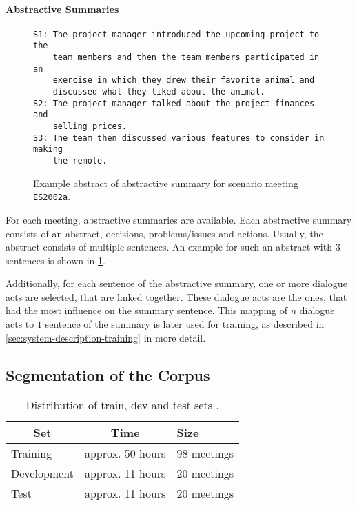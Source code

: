 \paragraph{Abstractive Summaries}

\begin{figure}[h]
\begin{lstlisting}[numbers=none]
S1: The project manager introduced the upcoming project to the 
    team members and then the team members participated in an
    exercise in which they drew their favorite animal and
    discussed what they liked about the animal.
S2: The project manager talked about the project finances and
    selling prices.
S3: The team then discussed various features to consider in making
    the remote.
\end{lstlisting}
\caption{Example abstract of abstractive summary for scenario meeting \texttt{ES2002a}.}
\label{fig:abstractive-summary-example}
\end{figure}

For each meeting, abstractive summaries are available.
Each abstractive summary consists of an abstract, decisions, problems/issues and actions.
Usually, the abstract consists of multiple sentences.
An example for such an abstract with 3 sentences is shown in \cref{fig:abstractive-summary-example}.

Additionally, for each sentence of the abstractive summary, one or more dialogue acts are selected, that are linked together.
These dialogue acts are the ones, that had the most influence on the summary sentence.
This mapping of $n$ dialogue acts to $1$ sentence of the summary is later used for training, as described in \cref{sec:system-description-training} in more detail. \cite{amiWebsite}

\subsection{Segmentation of the Corpus}\label{ssec:ami-segmentation-of-the-corpus}

\begin{table}[h]
\centering
\begin{tabular}{@{}lll@{}}
\toprule
\multicolumn{1}{c}{\textbf{Set}} & \multicolumn{1}{c}{\textbf{Time}} & \textbf{Size} \\ \midrule
Training                         & approx. 50 hours                  & 98 meetings   \\
Development                      & approx. 11 hours                  & 20 meetings   \\
Test                             & approx. 11 hours                  & 20 meetings   \\ \bottomrule
\end{tabular}
\caption[Distribution of train, dev and test sets]{Distribution of train, dev and test sets \cite{amiWebsite}.}
\label{tab:meeting-time-distribution}
\end{table}

